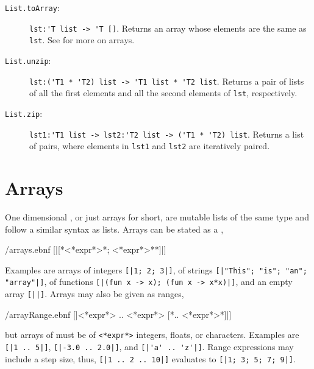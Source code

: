 \begin{description}
\item[\texttt{List.toArray}:] \lstinline{lst:'T list -> 'T []}. Returns an array whose elements are the same as \lstinline{lst}.  See  for more on arrays.
\item[\texttt{List.unzip}:] \lstinline{lst:('T1 * 'T2) list -> 'T1 list * 'T2 list}. Returns a pair of lists of all the first elements and all the second elements of \lstinline{lst}, respectively.
\item[\texttt{List.zip}:] \lstinline{lst1:'T1 list -> lst2:'T2 list -> ('T1 * 'T2) list}. Returns a list of pairs, where elements in \lstinline{lst1} and \lstinline{lst2} are iteratively paired.
\end{description}

\section{Arrays}
\label{sec:arrays}
One dimensional , or just arrays for short, are mutable lists of the same type and follow a similar syntax as lists. Arrays can be stated as a ,
%
\begin{verbatimwrite}{\ebnf/arrays.ebnf}
[|[*<*expr*>{*; <*expr*>*}*]|]
\end{verbatimwrite}
%
Examples are arrays of integers \mbox{\lstinline![|1; 2; 3|]!}, of strings \mbox{\lstinline![|"This"; "is"; "an"; "array"|]!}, of functions \mbox{\lstinline![|(fun x -> x); (fun x -> x*x)|]!}, and an empty array \lstinline![||]!.  Arrays may also be given as ranges,
%
\begin{verbatimwrite}{\ebnf/arrayRange.ebnf}
[|<*expr*> .. <*expr*> [*.. <*expr*>*]|]
\end{verbatimwrite}
%
but arrays of  must be of \lstinline[language=syntax]{<*expr*>} integers, floats, or characters. Examples are \mbox{\lstinline![|1 .. 5|]!}, \mbox{\lstinline![|-3.0 .. 2.0|]!}, and \mbox{\lstinline![|'a' .. 'z'|]!}. Range expressions may include a step size, thus, \mbox{\lstinline![|1 .. 2 .. 10|]!} evaluates to \mbox{\lstinline![|1; 3; 5; 7; 9|]!}.

